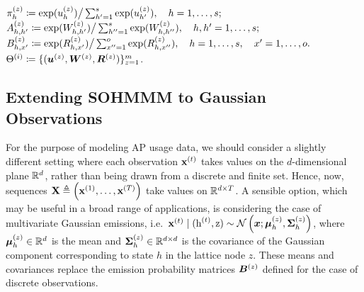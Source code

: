 \begin{algorithm}
\begin{algorithmic}[1]
		\vspace{0.3cm}
		\State ${\pi}_h^{(z)} \coloneqq \exp({u}_h^{(z)}) \big/ \sum_{h'=1}^{s}\exp({u}_{h'}^{(z)}), \quad h = 1, \dots, s;$
		\vspace{0.3cm}
		\State $ {A}^{(z)}_{h,h'} \coloneqq \exp({W}^{(z)}_{h,h'}) \big/ \sum_{h''=1}^{s} \exp({W}^{(z)}_{h,h''}), \quad h,h' = 1, \dots, s;$
		\vspace{0.3cm}
		\State ${B}^{(z)}_{h,x'} \coloneqq \exp({R}^{(z)}_{h,x'}) \big/ \sum_{x''=1}^{o} \exp({R}^{(z)}_{h,x''}), \quad h = 1, \dots, s, \quad x' = 1,\dots,o.$
		\vspace{0.3cm}
		\EndFor
		\vspace{0.3cm}
		\State $\Theta^{(i)} \coloneqq \lbrace ({\bm{u}}^{(z)}, {\bm{W}}^{(z)}, {\bm{R}}^{(z)}) \rbrace_{z=1}^m$.
		\vspace{0.3cm}
		\EndFor
		
	\end{algorithmic}
\end{algorithm}

\subsection{Extending SOHMMM to Gaussian Observations}
\label{sec:sohmmm_gaussian}

For the purpose of modeling AP usage data, we should consider a slightly different setting where each observation ${\mathbf{x}}^{(t)}$ takes values on the $d$-dimensional plane ${\mathbb{R}}^d$, rather than being drawn from a discrete and finite set. Hence, now, sequences ${\mathbf{X}} \triangleq \left({\mathbf{x}}^{(1)}, \dots, {\mathbf{x}}^{(T)} \right)$ take values on ${\mathbb{R}}^{d \times T}$. A sensible option, which may be useful in a broad range of applications, is considering the case of multivariate Gaussian emissions, i.e.\ ${\mathbf{x}}^{(t)} \mid ({\textnormal{h}}^{(t)}, {\textnormal{z}}) \sim \mathcal{N}\left({\bm{x}}; {\bm{\mu}}^{(z)}_h, {\bm{\Sigma}}^{(z)}_h\right)$, where ${\bm{\mu}}^{(z)}_h \in {\mathbb{R}}^d$ is the mean and ${\bm{\Sigma}}^{(z)}_h \in {\mathbb{R}}^{d \times d}$ is the covariance of the Gaussian component corresponding to state $h$ in the lattice node $z$. These means and covariances replace the emission probability matrices ${\bm{B}}^{(z)}$ defined for the case of discrete observations.

